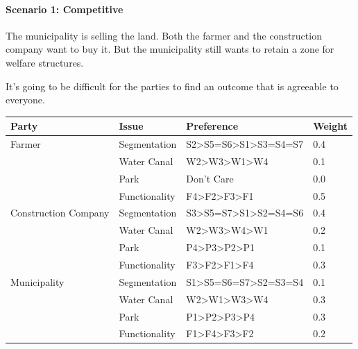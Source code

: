 \documentclass[a4,11pt]{scrartcl}
\begin{document}
    \paragraph{Scenario 1: Competitive} 
    
    The municipality is selling the land. Both the farmer and the 
    construction company want to buy it. But the municipality still 
    wants to retain a zone for welfare structures.
    
    It's going to be difficult for the parties to find an outcome that
    is agreeable to everyone.
    
    \begin{center}
    \begin{tabular}{|l|l|l|l|}
        \hline{}
        {\bf Party}&{\bf Issue}&{\bf Preference}&{\bf Weight}\\
        \hline\hline
        Farmer & Segmentation & S2\textgreater S5=S6\textgreater S1\textgreater S3=S4=S7 & 0.4\\
        \cline{2-4}&Water Canal & W2\textgreater W3\textgreater W1\textgreater W4&0.1\\
        \cline{2-4}&Park& Don't Care & 0.0\\
        \cline{2-4}&Functionality&F4\textgreater F2\textgreater F3\textgreater F1& 0.5\\
        \hline\hline{}
        Construction Company & Segmentation & S3\textgreater S5=S7\textgreater S1\textgreater S2=S4=S6 & 0.4\\
        \cline{2-4}&Water Canal & W2\textgreater W3\textgreater W4\textgreater W1&0.2\\
        \cline{2-4}&Park& P4\textgreater P3\textgreater P2\textgreater P1 & 0.1\\
        \cline{2-4}&Functionality&F3\textgreater F2\textgreater F1\textgreater F4& 0.3\\
        \hline\hline{}
        Municipality & Segmentation & S1\textgreater S5=S6=S7\textgreater S2=S3=S4 & 0.1\\
        \cline{2-4}&Water Canal & W2\textgreater W1\textgreater W3\textgreater W4&0.3\\
        \cline{2-4}&Park& P1\textgreater P2\textgreater P3\textgreater P4 & 0.3\\
        \cline{2-4}&Functionality&F1\textgreater F4\textgreater F3\textgreater F2& 0.2\\
        \hline
    \end{tabular}
    \end{center}
\end{document}
